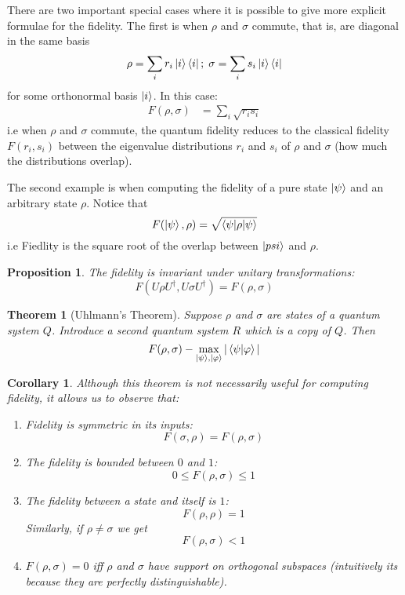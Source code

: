 \documentclass[11pt,a4paper]{article}
\theoremstyle{definition}
\theoremstyle{plain}
\newtheorem{theorem}[definition]{Theorem}
\newtheorem{proposition}[definition]{Proposition}
\newtheorem{corollary}[definition]{Corollary}
\theoremstyle{remark}
\begin{document}
There are two important special cases where it is possible to give more explicit formulae for the fidelity. The first is when $\rho$ and $\sigma$ commute, that is, are diagonal in the same basis 
$$\rho = \sum_{i} r_i \ket{i} \bra{i}; \; \sigma = \sum_i s_i \ket{i} \bra{i}$$
for some orthonormal basis $\ket{i}$. In this case: 
\begin{align*}
  F(\rho, \sigma) &= \sum_i \sqrt{r_i s_i}
\end{align*}
i.e when $\rho$ and $\sigma$ commute, the quantum fidelity reduces to the classical fidelity $F(r_i, s_i)$ between the eigenvalue distributions $r_i$ and $s_i$ of 
$\rho$ and $\sigma$ (how much the distributions overlap).

The second example is when computing the fidelity of a pure state $\ket{\psi}$ and an arbitrary state 
$\rho$. Notice that 
$$F(\ket{\psi}, \rho) = \sqrt{\braket{\psi | \rho | \psi}}$$
i.e Fiedlity is the square root of the overlap between $\ket{psi}$ and $\rho$.

\begin{proposition}
  The fidelity is invariant under unitary transformations: 
  $$F(U \rho U^\dagger, U \sigma U^\dagger) = F(\rho, \sigma)$$
\end{proposition}

\begin{theorem}[Uhlmann's Theorem] \label{thm:fidelity-purification}
  Suppose $\rho$ and $\sigma$ are states of a quantum system $Q$. Introduce a second quantum system $R$ 
  which is a copy of $Q$. Then 
  $$F(\rho, \sigma) - \max_{\ket{\psi}, \ket{\varphi}} |\braket{\psi | \varphi}|$$
\end{theorem}

\begin{corollary}
  Although this theorem is not necessarily useful for computing fidelity, it allows us to observe that: 
  \begin{enumerate}
    \item Fidelity is symmetric in its inputs: 
    $$F(\sigma, \rho) = F(\rho, \sigma)$$

    \item The fidelity is bounded between $0$ and $1$: 
    $$0 \leq F(\rho, \sigma) \leq 1$$

    \item The fidelity between a state and itself is $1$: 
    $$F(\rho, \rho) = 1$$
    Similarly, if $\rho \neq \sigma$ we get 
    $$F(\rho, \sigma) < 1$$

    \item $F(\rho, \sigma) = 0$ iff $\rho$ and $\sigma$ have support on orthogonal subspaces (intuitively its because they are perfectly distinguishable).  
  \end{enumerate}
\end{corollary}
\end{document}
